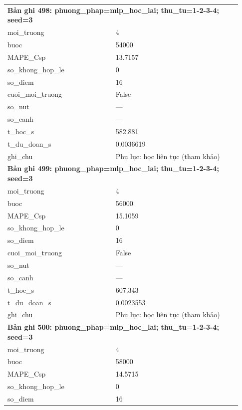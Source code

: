 \begin{longtable}{p{0.43\linewidth}p{0.50\linewidth}}
\midrule
\multicolumn{2}{p{0.95\linewidth}}{\textbf{Bản ghi 498: phuong\_phap=mlp\_hoc\_lai; thu\_tu=1-2-3-4; seed=3}} \\
moi\_\allowbreak truong & 4 \\
buoc & 54000 \\
MAPE\_\allowbreak Csp & 13.7157 \\
so\_\allowbreak khong\_\allowbreak hop\_\allowbreak le & 0 \\
so\_\allowbreak diem & 16 \\
cuoi\_\allowbreak moi\_\allowbreak truong & False \\
so\_\allowbreak nut & — \\
so\_\allowbreak canh & — \\
t\_\allowbreak hoc\_\allowbreak s & 582.881 \\
t\_\allowbreak du\_\allowbreak doan\_\allowbreak s & 0.0036619 \\
ghi\_\allowbreak chu & Phụ lục: học liên tục (tham khảo) \\
\midrule
\multicolumn{2}{p{0.95\linewidth}}{\textbf{Bản ghi 499: phuong\_phap=mlp\_hoc\_lai; thu\_tu=1-2-3-4; seed=3}} \\
moi\_\allowbreak truong & 4 \\
buoc & 56000 \\
MAPE\_\allowbreak Csp & 15.1059 \\
so\_\allowbreak khong\_\allowbreak hop\_\allowbreak le & 0 \\
so\_\allowbreak diem & 16 \\
cuoi\_\allowbreak moi\_\allowbreak truong & False \\
so\_\allowbreak nut & — \\
so\_\allowbreak canh & — \\
t\_\allowbreak hoc\_\allowbreak s & 607.343 \\
t\_\allowbreak du\_\allowbreak doan\_\allowbreak s & 0.0023553 \\
ghi\_\allowbreak chu & Phụ lục: học liên tục (tham khảo) \\
\midrule
\multicolumn{2}{p{0.95\linewidth}}{\textbf{Bản ghi 500: phuong\_phap=mlp\_hoc\_lai; thu\_tu=1-2-3-4; seed=3}} \\
moi\_\allowbreak truong & 4 \\
buoc & 58000 \\
MAPE\_\allowbreak Csp & 14.5715 \\
so\_\allowbreak khong\_\allowbreak hop\_\allowbreak le & 0 \\
so\_\allowbreak diem & 16 \\

\end{longtable}
